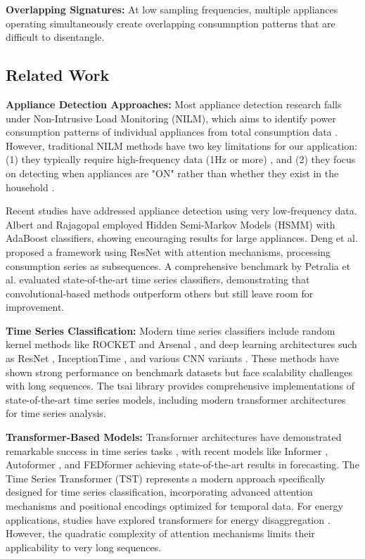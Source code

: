 \documentclass[conference]{IEEEtran}
\begin{document}
\textbf{Overlapping Signatures:} At low sampling frequencies, multiple appliances operating simultaneously create overlapping consumnption patterns that are difficult to disentangle.

\subsection{Related Work}

\textbf{Appliance Detection Approaches:} Most appliance detection research falls under Non-Intrusive Load Monitoring (NILM), which aims to identify power consumption patterns of individual appliances from total consumption data \cite{kaselimi2022towards}. However, traditional NILM methods have two key limitations for our application: (1) they typically require high-frequency data (1Hz or more) \cite{kahl2022representation, kahl2017comprehensive}, and (2) they focus on detecting when appliances are "ON" rather than whether they exist in the household \cite{aslan2022efficient, paradiso2013ann}.

Recent studies have addressed appliance detection using very low-frequency data. Albert and Rajagopal \cite{albert2013smart} employed Hidden Semi-Markov Models (HSMM) with AdaBoost classifiers, showing encouraging results for large appliances. Deng et al. \cite{deng2022residential} proposed a framework using ResNet with attention mechanisms, processing consumption series as subsequences. A comprehensive benchmark by Petralia et al. \cite{petralia2023appliance} evaluated state-of-the-art time series classifiers, demonstrating that convolutional-based methods outperform others but still leave room for improvement.

\textbf{Time Series Classification:} Modern time series classifiers include random kernel methods like ROCKET \cite{dempster2019rocket} and Arsenal \cite{middlehurst2021hive}, and deep learning architectures such as ResNet \cite{wang2016time}, InceptionTime \cite{fawaz2020inceptiontime}, and various CNN variants \cite{fawaz2019deep}. These methods have shown strong performance on benchmark datasets but face scalability challenges with long sequences. The tsai library \cite{tsai2022} provides comprehensive implementations of state-of-the-art time series models, including modern transformer architectures for time series analysis.

\textbf{Transformer-Based Models:} Transformer architectures have demonstrated remarkable success in time series tasks \cite{wen2022transformers}, with recent models like Informer \cite{zhou2020informer}, Autoformer \cite{wu2021autoformer}, and FEDformer \cite{zhou2022fedformer} achieving state-of-the-art results in forecasting. The Time Series Transformer (TST) \cite{tst2022tsai} represents a modern approach specifically designed for time series classification, incorporating advanced attention mechanisms and positional encodings optimized for temporal data. For energy applications, studies have explored transformers for energy disaggregation \cite{yue2020bert4nilm, sykiotis2022electricity}. However, the quadratic complexity of attention mechanisms limits their applicability to very long sequences.
\end{document}
